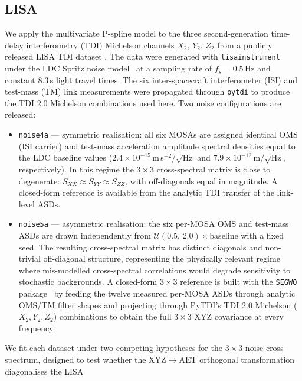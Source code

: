 \documentclass[%
	reprint,
	nofootinbib,
	amsmath,
	amssymb,
	aps,
]{revtex4-2}
\begin{document}
	\subsection{LISA}
	\label{subsec:lisa}
	We apply the multivariate P-spline model to the three second-generation
	time-delay interferometry (TDI) Michelson channels $X_{2}$, $Y_{2}$,
	$Z_{2}$ from a publicly released LISA TDI dataset
	\citep{lisa_noise4a, lisa_noise5a}. The data were generated with
	\texttt{lisainstrument}~\citep{bayle2024lisainstrument} under the LDC Spritz
	noise model~\citep{ldcspritz} at a sampling rate of
	$f_{s}=0.5$\,Hz and constant $8.3$\,s light travel times. The six
	inter-spacecraft interferometer (ISI) and test-mass (TM) link
	measurements were propagated through \texttt{pytdi}
	\citep{staab2022pytdi} to produce the TDI 2.0 Michelson combinations used
	here. Two noise configurations are released:
	\begin{itemize}
		\item \texttt{noise4a} --- symmetric realisation: all six MOSAs
		are assigned identical OMS (ISI carrier) and test-mass acceleration
		amplitude spectral densities equal to the LDC baseline values
		($2.4\times10^{-15}$\,m\,s$^{-2}$/$\sqrt{\mathrm{Hz}}$ and
		$7.9\times10^{-12}$\,m/$\sqrt{\mathrm{Hz}}$, respectively). In this
		regime the $3\times3$ cross-spectral matrix is close to degenerate:
		$S_{XX}\!\approx\!S_{YY}\!\approx\!S_{ZZ}$, with off-diagonals equal in
		magnitude. A closed-form reference is available from the
		analytic TDI transfer of the link-level ASDs.
		\item \texttt{noise5a} --- asymmetric realisation: the six
		per-MOSA OMS and test-mass ASDs are drawn independently from
		$\mathcal{U}(0.5,\,2.0)\times$baseline with a fixed seed. The
		resulting cross-spectral matrix has distinct diagonals and
		non-trivial off-diagonal structure, representing the physically
		relevant regime where mis-modelled cross-spectral correlations
		would degrade sensitivity to stochastic backgrounds. A
		closed-form $3\times3$ reference is built with the
		\texttt{SEGWO} package~\citep{bayle_segwo} by feeding the
		twelve measured per-MOSA ASDs through analytic OMS/TM filter
		shapes and projecting through PyTDI's TDI 2.0 Michelson
		($X_{2},Y_{2},Z_{2}$) combinations to obtain the full
		$3\times3$ XYZ covariance at every frequency.
	\end{itemize}
	We fit each dataset under two competing hypotheses for the
	$3\times3$ noise cross-spectrum, designed to test whether the
	XYZ$\to$AET orthogonal transformation diagonalises the LISA
\end{document}
